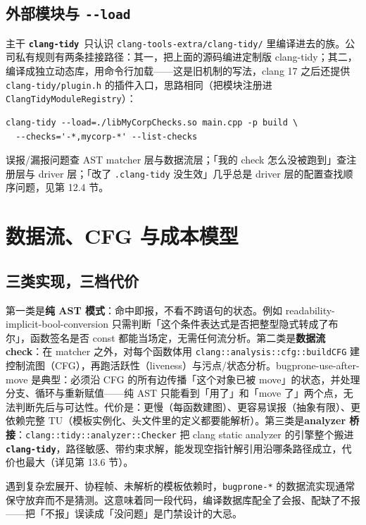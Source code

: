 \documentclass[12pt,a4paper,fontset=fandol]{ctexbook}
\newcommand{\Tp}[1]{\texttt{#1}}
\newcommand{\Opt}[1]{\texttt{-\/-#1}}
\newcommand{\Lib}[1]{\textbf{\texttt{#1}}}
\newcommand{\Tidy}{\Lib{clang-tidy}}
\begin{document}
\subsection{外部模块与 \Opt{load}}\label{sec:ch12-s1c}
主干 \Tidy\ 只认识 \texttt{clang-tools-extra/clang-tidy/} 里编译进去的族。公司私有规则有两条挂接路径：其一，把上面的源码编进定制版 clang-tidy；其二，编译成独立动态库，用命令行加载——这是旧机制的写法，clang 17 之后还提供 \texttt{clang-tidy/plugin.h} 的插件入口，思路相同（把模块注册进 \Tp{ClangTidyModuleRegistry}）：
\begin{lstlisting}[style=shellstyle,caption={加载外部 check 模块并确认注册成功},label={lst:ch12-load}]
clang-tidy --load=./libMyCorpChecks.so main.cpp -p build \
  --checks='-*,mycorp-*' --list-checks
\end{lstlisting}
\begin{guideline}[title={分层决定排障方向}]
误报/漏报问题查 AST matcher 层与数据流层；「我的 check 怎么没被跑到」查注册层与 driver 层；「改了 \texttt{.clang-tidy} 没生效」几乎总是 driver 层的配置查找顺序问题，见第 12.4 节。
\end{guideline}
\section{数据流、CFG 与成本模型}\label{sec:ch12-s2}
\subsection{三类实现，三档代价}\label{sec:ch12-s2a}
第一类是\textbf{纯 AST 模式}：命中即报，不看不跨语句的状态。例如 readability-implicit-bool-conversion 只需判断「这个条件表达式是否把整型隐式转成了布尔」，函数签名是否 const 都能当场定，无需任何流分析。第二类是\textbf{数据流 check}：在 matcher 之外，对每个函数体用 \texttt{clang::analysis::cfg::buildCFG} 建控制流图（CFG），再跑活跃性（liveness）与污点/状态分析。bugprone-use-after-move 是典型：必须沿 CFG 的所有边传播「这个对象已被 move」的状态，并处理分支、循环与重新赋值——纯 AST 只能看到「用了」和「move 了」两个点，无法判断先后与可达性。代价是：更慢（每函数建图）、更容易误报（抽象有限）、更依赖完整 TU（模板实例化、头文件里的定义都要能解析）。第三类是\textbf{analyzer 桥接}：\Tp{clang::tidy::analyzer::Checker} 把 clang static analyzer 的引擎整个搬进 \Tidy ，路径敏感、带约束求解，能发现空指针解引用沿哪条路径成立，代价也最大（详见第 13.6 节）。
\begin{warning}[title={数据流 check 在边界处会「装死」}]
遇到复杂宏展开、协程帧、未解析的模板依赖时，\texttt{bugprone-*} 的数据流实现通常保守放弃而不是猜测。这意味着同一段代码，编译数据库配全了会报、配缺了不报——把「不报」误读成「没问题」是门禁设计的大忌。
\end{warning}
\end{document}
